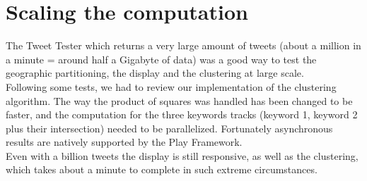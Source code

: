 \section{Scaling the computation}

The Tweet Tester which returns a very large amount of tweets (about a million in a minute = around half a Gigabyte of data) was a good way to test the geographic partitioning, the display and the clustering at large scale.\\

Following some tests, we had to review our implementation of the clustering algorithm. The way the product of squares was handled has been changed to be faster, and the computation for the three keywords tracks (keyword 1, keyword 2 plus their intersection) needed to be parallelized. Fortunately asynchronous results are natively supported by the Play Framework. \\

Even with a billion tweets the display is still responsive, as well as the clustering, which takes about a minute to complete in such extreme circumstances.